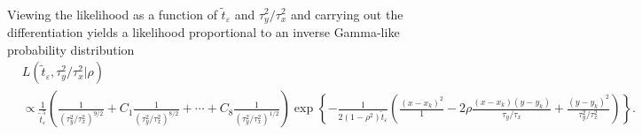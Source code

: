 \documentclass[10pt]{article}
\begin{document}
\begin{enumerate}
\begin{align}
    \end{align}
    Viewing the likelihood as a function of $\tilde{t}_\varepsilon$
    and $\tau_y^2/\tau_x^2$ and carrying out the differentiation
    yields a likelihood proportional to an inverse Gamma-like
    probability distribution
    \begin{align}
      &L(\tilde{t}_\varepsilon, \tau_y^2/\tau_x^2 | \rho) \nonumber \\
      &\propto \frac{1}{\tilde{t}_\varepsilon^5}\left(\frac{1}{(\tau_y^2/\tau_x^2)^{9/2}} + C_1 \frac{1}{(\tau_y^2/\tau_x^2)^{8/2}} + \cdots + C_8 \frac{1}{(\tau_y^2/\tau_x^2)^{1/2}} \right) \exp\left\{ -\frac{1}{2(1-\rho^2)\tilde{t}_\varepsilon} \left( \frac{(x - x_k)^2}{1} - 2\rho \frac{(x-x_k)(y-y_k)}{\tau_y/\tau_x} +  \frac{(y - y_k)^2}{\tau_y^2/\tau_x^2}  \right)  \right\} . \label{eq:inv-Gam-likelihood}
    \end{align}


\end{enumerate}
\end{document}
